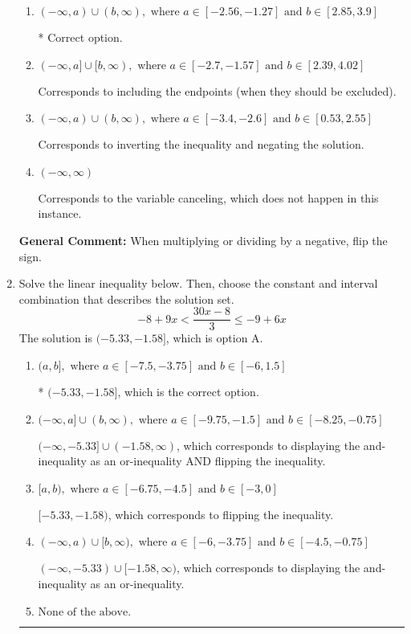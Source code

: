 \documentclass{extbook}[14pt]
\newcommand{\litem}[1]{\item #1

\rule{\textwidth}{0.4pt}}
\begin{document}
\begin{enumerate}
{\begin{enumerate}[label=\Alph*.]
Corresponds to including the endpoints AND negating.
\item \( (-\infty, a) \cup (b, \infty), \text{ where } a \in [-2.56, -1.27] \text{ and } b \in [2.85, 3.9] \)

 * Correct option.
\item \( (-\infty, a] \cup [b, \infty), \text{ where } a \in [-2.7, -1.57] \text{ and } b \in [2.39, 4.02] \)

Corresponds to including the endpoints (when they should be excluded).
\item \( (-\infty, a) \cup (b, \infty), \text{ where } a \in [-3.4, -2.6] \text{ and } b \in [0.53, 2.55] \)

Corresponds to inverting the inequality and negating the solution.
\item \( (-\infty, \infty) \)

Corresponds to the variable canceling, which does not happen in this instance.
\end{enumerate}

\textbf{General Comment:} When multiplying or dividing by a negative, flip the sign.
}
\litem{
Solve the linear inequality below. Then, choose the constant and interval combination that describes the solution set.
\[ -8 + 9 x < \frac{30 x - 8}{3} \leq -9 + 6 x \]The solution is \( (-5.33, -1.58] \), which is option A.\begin{enumerate}[label=\Alph*.]
\item \( (a, b], \text{ where } a \in [-7.5, -3.75] \text{ and } b \in [-6, 1.5] \)

* $(-5.33, -1.58]$, which is the correct option.
\item \( (-\infty, a] \cup (b, \infty), \text{ where } a \in [-9.75, -1.5] \text{ and } b \in [-8.25, -0.75] \)

$(-\infty, -5.33] \cup (-1.58, \infty)$, which corresponds to displaying the and-inequality as an or-inequality AND flipping the inequality.
\item \( [a, b), \text{ where } a \in [-6.75, -4.5] \text{ and } b \in [-3, 0] \)

$[-5.33, -1.58)$, which corresponds to flipping the inequality.
\item \( (-\infty, a) \cup [b, \infty), \text{ where } a \in [-6, -3.75] \text{ and } b \in [-4.5, -0.75] \)

$(-\infty, -5.33) \cup [-1.58, \infty)$, which corresponds to displaying the and-inequality as an or-inequality.
\item \( \text{None of the above.} \)



\end{enumerate}}
\end{enumerate}
\end{document}
